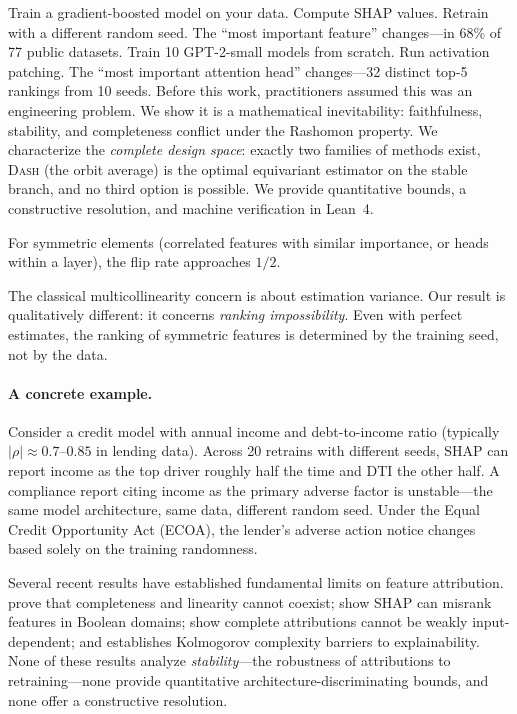 \documentclass{jmlr}
\newcommand{\DASH}{\textsc{Dash}}
\begin{document}
Train a gradient-boosted model on your data. Compute SHAP values. Retrain with a different random seed. The ``most important feature'' changes---in 68\% of 77 public datasets. Train 10 GPT-2-small models from scratch. Run activation patching. The ``most important attention head'' changes---32 distinct top-5 rankings from 10 seeds. Before this work, practitioners assumed this was an engineering problem. We show it is a mathematical inevitability: faithfulness, stability, and completeness conflict under the Rashomon property. We characterize the \emph{complete design space}: exactly two families of methods exist, \DASH{} (the orbit average) is the optimal equivariant estimator on the stable branch, and no third option is possible. We provide quantitative bounds, a constructive resolution, and machine verification in Lean~4.

For symmetric elements (correlated features with similar importance, or heads within a layer), the flip rate approaches $1/2$.

The classical multicollinearity concern is about estimation variance. Our result is qualitatively different: it concerns \emph{ranking impossibility}. Even with perfect estimates, the ranking of symmetric features is determined by the training seed, not by the data.

\paragraph{A concrete example.}
Consider a credit model with annual income and debt-to-income ratio
(typically $|\rho| \approx 0.7$--$0.85$ in lending data). Across 20 retrains with different seeds, SHAP
can report income as the top driver roughly half the time and DTI the other half.
A compliance report citing income as the primary adverse factor
is unstable---the same model architecture, same data, different
random seed. Under the Equal Credit Opportunity Act (ECOA), the lender's adverse action notice
changes based solely on the training randomness.

Several recent results have established fundamental limits on feature attribution.
\citet{bilodeau2024impossibility} prove that completeness and linearity cannot coexist; \citet{huang2024failings} show SHAP can misrank features in Boolean domains; \citet{srinivas2019full} show complete attributions cannot be weakly input-dependent; and \citet{rao2025limits} establishes Kolmogorov complexity barriers to explainability.
None of these results analyze \emph{stability}---the robustness of attributions to retraining---none provide quantitative architecture-discriminating bounds, and none offer a constructive resolution.
\end{document}
